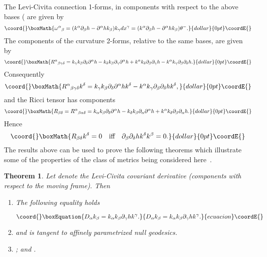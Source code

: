 \documentclass[12pt,a4paper]{article}
\newcounter{theorem}
\newtheorem{theorem}{Theorem}[section]   %
\newcounter{eg}
\def\p{\partial}
\begin{document}
The Levi-Civita connection 1-forms, in components with respect to the above
bases (\coordHE{} are given by
$$\coord{}\boxMath{
\omega^{\alpha}{}_{\beta} = (k^{\alpha}\p_\beta h - 
\p^\alpha h k_{\beta})k_{\gamma}dx^{\gamma} =
(k^{\alpha}\p_\beta h -\p^\alpha h k_{\beta})\theta^{-}.
}{dollar}{0pt}\coordE{}$$
The components of the curvature 2-forms, relative to the same bases,
are given by
$$\coord{}\boxMath{
R^{\alpha}{}_{\beta\gamma\delta} =
k_{\gamma}k_{\beta}\p_\delta \p^{\alpha}h -
k_{\delta}k_{\beta}\p_{\gamma}\p^{\alpha} h + k^{\alpha}
k_{\delta} \p_{\beta}\p_{\gamma}h - 
k^{\alpha}k_{\gamma} \p_{\beta}\p_{\delta} h.
}{dollar}{0pt}\coordE{}$$
Consequently
$$\coord{}\boxMath{
R^{\alpha}{}_{\beta\gamma\delta} k^{\delta} = 
k_{\gamma}k_{\beta}\p_\delta \p^{\alpha} h k^{\delta} - 
k^{\alpha}k_{\gamma}\p_{\beta}\p_{\delta} h k^{\delta},
}{dollar}{0pt}\coordE{}$$
and the Ricci tensor has components
$$\coord{}\boxMath{
 R_{\beta\delta} = R^{\alpha}{}_{\beta\alpha\delta}
= k_{\alpha}k_{\beta}\p_\delta \p^{\alpha} h - 
k_{\delta} k_{\beta}\p_\alpha \p^{\alpha} h + 
k^{\alpha} k_{\delta} \p_{\beta}\p_{\alpha} h.
}{dollar}{0pt}\coordE{}$$
Hence
$$\coord{}\boxMath{
R_{\beta\delta}k^{\delta}=0 \quad \mbox{iff} \quad
\p_{\beta}\p_{\delta}hk^{\delta}k^{\beta}=0.
}{dollar}{0pt}\coordE{}$$
The results above can be used to prove the following theorems which
illustrate some of the properties of the class of metrics being
considered here~\cite{KraSteMacHer80,MisThoWhe73,EhlKun62,Pir65,Gri91}.

\begin{theorem}
  
Let \coordHE{}denote the Levi-Civita covariant derivative
(components with respect to the moving frame). Then

\begin{enumerate}

\item The following equality holds

\begin{equation}\coord{}\boxEquation{
D_\alpha k_{\beta}=k_{\alpha}k_{\beta}\p_{\gamma} h k^{\gamma}.
}{
D_\alpha k_{\beta}=k_{\alpha}k_{\beta}\p_{\gamma} h k^{\gamma}.
}{ecuacion}\coordE{}\end{equation}

\item {}\coordHE{} and \coordHE{} is
  tangent to affinely parametrized null geodesics.

\item {}\coordHE{}; \quad 
{}\coordHE{} \quad \hbox{and} \quad 
{}\coordHE{}. 

\end{enumerate}
\end{theorem}
\end{document}

